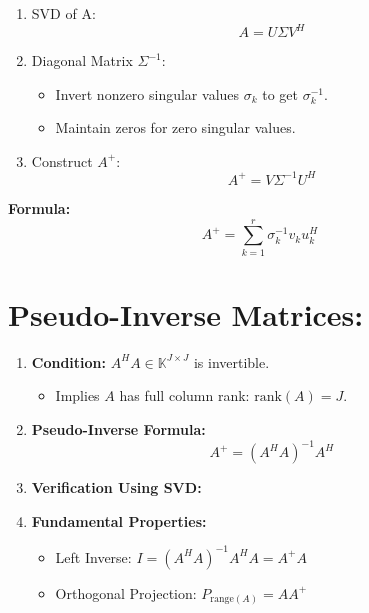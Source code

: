 \documentclass{article}
\begin{document}
\begin{enumerate}
    \item SVD of A:
    \[
    A = U \Sigma V^H
    \]
    
    \item Diagonal Matrix $\Sigma^{-1}$:
    \begin{itemize}
        \item Invert nonzero singular values $\sigma_k$ to get $\sigma_k^{-1}$.
        \item Maintain zeros for zero singular values.
    \end{itemize}
    
    \item Construct $A^+$:
    \[
    A^+ = V \Sigma^{-1} U^H
    \]

\end{enumerate}

\textbf{Formula:}
\[
A^+ = \sum_{k=1}^{r} \sigma_k^{-1} v_k u_k^H
\]









\section*{Pseudo-Inverse Matrices:}

\begin{enumerate}
    \item \textbf{Condition:} $A^H A \in \mathbb{K}^{J \times J}$ is invertible.
    \begin{itemize}
        \item Implies $A$ has full column rank: $\text{rank}(A) = J$.
    \end{itemize}
    
    \item \textbf{Pseudo-Inverse Formula:}
    \[
    A^+ = (A^H A)^{-1} A^H
    \]

    \item \textbf{Verification Using SVD:}
    
    \item \textbf{Fundamental Properties:}
    \begin{itemize}
        \item Left Inverse: $I = (A^H A)^{-1} A^H A = A^+ A$
        \item Orthogonal Projection: $P_{(A)} = AA^+$
    \end{itemize}
\end{enumerate}
\end{document}
